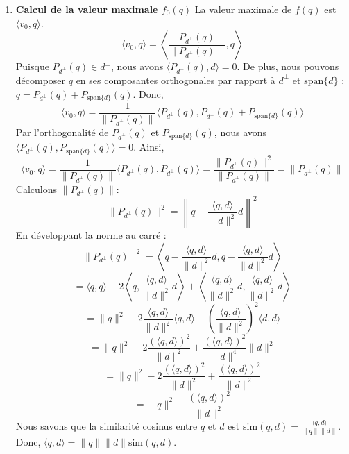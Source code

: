 \documentclass[11pt,a4paper]{report}
\begin{document}
\begin{enumerate}
\begin{enumerate}
    La forme linéaire \(f_0\) est alors \(\Phi(v_0)\).
    \[ f_0 = \Phi\left(\frac{q - \frac{\langle q, d \rangle}{\|d\|^2} d}{\left\|q - \frac{\langle q, d \rangle}{\|d\|^2} d\right\|}\right) \]
    Pour tout \(x \in V\),
    \(f_0(x) = \left\langle \frac{q - \frac{\langle q, d \rangle}{\|d\|^2} d}{\left\|q - \frac{\langle q, d \rangle}{\|d\|^2} d\right\|}, x \right\rangle\).
  \item
    \textbf{Calcul de la valeur maximale \(f_0(q)\)} La valeur maximale
    de \(f(q)\) est \(\langle v_0, q \rangle\).
    \[ \langle v_0, q \rangle = \left\langle \frac{P_{d^\perp}(q)}{\|P_{d^\perp}(q)\|}, q \right\rangle \]
    Puisque \(P_{d^\perp}(q) \in d^\perp\), nous avons
    \(\langle P_{d^\perp}(q), d \rangle = 0\). De plus, nous pouvons
    décomposer \(q\) en ses composantes orthogonales par rapport à
    \(d^\perp\) et \(\text{span}\{d\}\) :
    \(q = P_{d^\perp}(q) + P_{\text{span}\{d\}}(q)\). Donc,
    \[ \langle v_0, q \rangle = \frac{1}{\|P_{d^\perp}(q)\|} \langle P_{d^\perp}(q), P_{d^\perp}(q) + P_{\text{span}\{d\}}(q) \rangle \]
    Par l'orthogonalité de \(P_{d^\perp}(q)\) et
    \(P_{\text{span}\{d\}}(q)\), nous avons
    \(\langle P_{d^\perp}(q), P_{\text{span}\{d\}}(q) \rangle = 0\).
    Ainsi,
    \[ \langle v_0, q \rangle = \frac{1}{\|P_{d^\perp}(q)\|} \langle P_{d^\perp}(q), P_{d^\perp}(q) \rangle = \frac{\|P_{d^\perp}(q)\|^2}{\|P_{d^\perp}(q)\|} = \|P_{d^\perp}(q)\| \]
    Calculons \(\|P_{d^\perp}(q)\|\):
    \[ \|P_{d^\perp}(q)\|^2 = \left\|q - \frac{\langle q, d \rangle}{\|d\|^2} d\right\|^2 \]
    En développant la norme au carré :
    \[ \|P_{d^\perp}(q)\|^2 = \left\langle q - \frac{\langle q, d \rangle}{\|d\|^2} d, q - \frac{\langle q, d \rangle}{\|d\|^2} d \right\rangle \]
    \[ = \langle q, q \rangle - 2 \left\langle q, \frac{\langle q, d \rangle}{\|d\|^2} d \right\rangle + \left\langle \frac{\langle q, d \rangle}{\|d\|^2} d, \frac{\langle q, d \rangle}{\|d\|^2} d \right\rangle \]
    \[ = \|q\|^2 - 2 \frac{\langle q, d \rangle}{\|d\|^2} \langle q, d \rangle + \left(\frac{\langle q, d \rangle}{\|d\|^2}\right)^2 \langle d, d \rangle \]
    \[ = \|q\|^2 - 2 \frac{(\langle q, d \rangle)^2}{\|d\|^2} + \frac{(\langle q, d \rangle)^2}{\|d\|^4} \|d\|^2 \]
    \[ = \|q\|^2 - 2 \frac{(\langle q, d \rangle)^2}{\|d\|^2} + \frac{(\langle q, d \rangle)^2}{\|d\|^2} \]
    \[ = \|q\|^2 - \frac{(\langle q, d \rangle)^2}{\|d\|^2} \] Nous
    savons que la similarité cosinus entre \(q\) et \(d\) est
    \(\text{sim}(q,d) = \frac{\langle q, d \rangle}{\|q\| \|d\|}\).
    Donc, \(\langle q, d \rangle = \|q\| \|d\| \text{sim}(q,d)\).

\end{enumerate}
\end{enumerate}
\end{document}
